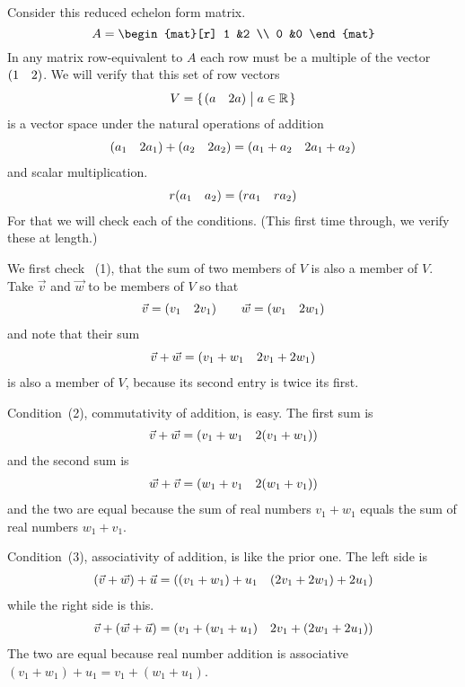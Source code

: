 \documentclass[10pt,t]{beamer}
\begin{document}
\begin{frame}
\ex
Consider this reduced echelon form matrix.
\begin{equation*}
  A=\begin{mat}[r]
    1  &2  \\
    0  &0  
  \end{mat}
\end{equation*}
In any matrix row-equivalent to $A$ each row must be a multiple of
the vector $(\begin{matrix} 1  &2 \end{matrix})$.
We will verify that this set of row vectors
\begin{equation*}
  V=\mbox{$\{\hspace{0.1em}(\begin{matrix} a  &2a \end{matrix})\bigm| a\in\mathbb{R}\hspace{0.1em}\}$}
\end{equation*}
is a vector space under the natural operations of addition
\begin{equation*}
  (\begin{matrix} a_1 &2a_1 \end{matrix})+(\begin{matrix} a_2 &2a_2 \end{matrix})
  =
  (\begin{matrix} a_1+a_2 &2a_1+a_2 \end{matrix})
\end{equation*}
and scalar multiplication.
\begin{equation*}
  r(\begin{matrix} a_1 &a_2 \end{matrix})
  =
  (\begin{matrix} ra_1 &ra_2 \end{matrix})
\end{equation*}
For that we will check each of the conditions.
(This first time through, we verify these at length.)
\end{frame}\begin{frame}
We first check ~(1),
that the sum of two members of $V$
is also a member of $V$.
Take $\vec{v}$ and  $\vec{w}$ to be members of $V$ so that
\begin{equation*}
  \vec{v}=(\begin{matrix} v_1 &2v_1 \end{matrix})
  \qquad
  \vec{w}=(\begin{matrix} w_1 &2w_1 \end{matrix})  
\end{equation*}
and note that their sum
\begin{equation*}
  \vec{v}+\vec{w}=
  (\begin{matrix} v_1+w_1 &2v_1+2w_1 \end{matrix})
\end{equation*} 
is also a member of $V$, because its second entry is twice its first.

\pause
Condition~(2), commutativity of addition, is easy.
The first sum is 
\begin{equation*}
  \vec{v}+\vec{w}=(\begin{matrix} v_1+w_1 &2(v_1+w_1) \end{matrix})
\end{equation*}
and the second sum is
\begin{equation*}
  \vec{w}+\vec{v}
  =
  (\begin{matrix} w_1+v_1 &2(w_1+v_1) \end{matrix})  
\end{equation*}
and the two are equal because the sum of real numbers
$v_1+w_1$ equals the sum of real numbers $w_1+v_1$.
\end{frame}\begin{frame}
Condition~(3), associativity of addition, is like the prior one.
The left side is 
\begin{equation*}
  (\vec{v}+\vec{w})+\vec{u}=(\begin{matrix} (v_1+w_1)+u_1 &(2v_1+2w_1)+2u_1 \end{matrix})
\end{equation*}
while the right side is this.
\begin{equation*}
  \vec{v}+(\vec{w}+\vec{u})
  =
  (\begin{matrix} v_1+(w_1+u_1) &2v_1+(2w_1+2u_1) \end{matrix})  
\end{equation*}
The two are equal because real number addition is associative 
$(v_1+w_1)+u_1=v_1+(w_1+u_1)$.


\end{frame}
\end{document}

